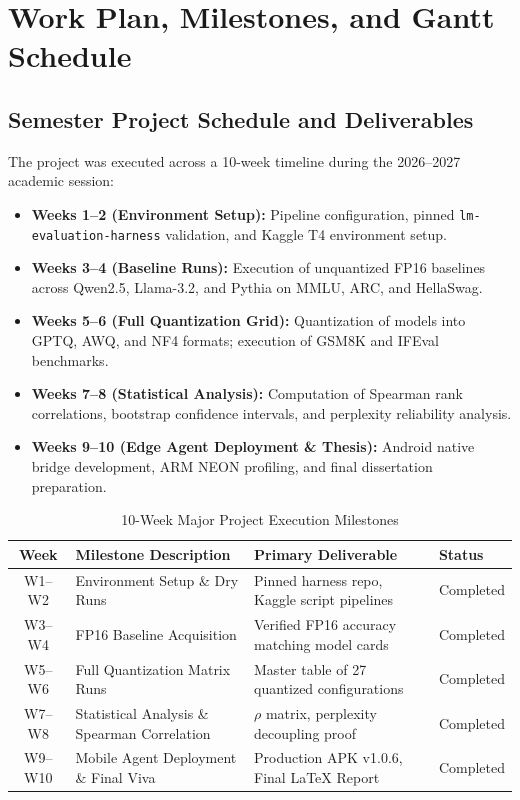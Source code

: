 \documentclass[12pt,a4paper,oneside]{report}
\begin{document}
\chapter{Work Plan, Milestones, and Gantt Schedule}

\section{Semester Project Schedule and Deliverables}
The project was executed across a 10-week timeline during the 2026--2027 academic session:
\begin{itemize}[leftmargin=*]
    \item \textbf{Weeks 1--2 (Environment Setup):} Pipeline configuration, pinned \texttt{lm-evaluation-harness} validation, and Kaggle T4 environment setup.
    \item \textbf{Weeks 3--4 (Baseline Runs):} Execution of unquantized FP16 baselines across Qwen2.5, Llama-3.2, and Pythia on MMLU, ARC, and HellaSwag.
    \item \textbf{Weeks 5--6 (Full Quantization Grid):} Quantization of models into GPTQ, AWQ, and NF4 formats; execution of GSM8K and IFEval benchmarks.
    \item \textbf{Weeks 7--8 (Statistical Analysis):} Computation of Spearman rank correlations, bootstrap confidence intervals, and perplexity reliability analysis.
    \item \textbf{Weeks 9--10 (Edge Agent Deployment & Thesis):} Android native bridge development, ARM NEON profiling, and final dissertation preparation.
\end{itemize}

\begin{table}[h!]
\centering
\caption{10-Week Major Project Execution Milestones}
\label{tab:gantt_table}
\renewcommand{\arraystretch}{1.2}
\begin{tabular}{clll}
\toprule
\textbf{Week} & \textbf{Milestone Description} & \textbf{Primary Deliverable} & \textbf{Status} \\
\midrule
W1--W2 & Environment Setup \& Dry Runs & Pinned harness repo, Kaggle script pipelines & Completed \\
W3--W4 & FP16 Baseline Acquisition & Verified FP16 accuracy matching model cards & Completed \\
W5--W6 & Full Quantization Matrix Runs & Master table of 27 quantized configurations & Completed \\
W7--W8 & Statistical Analysis \& Spearman Correlation & $\rho$ matrix, perplexity decoupling proof & Completed \\
W9--W10 & Mobile Agent Deployment \& Final Viva & Production APK v1.0.6, Final LaTeX Report & Completed \\
\bottomrule
\end{tabular}
\end{table}
\end{document}
